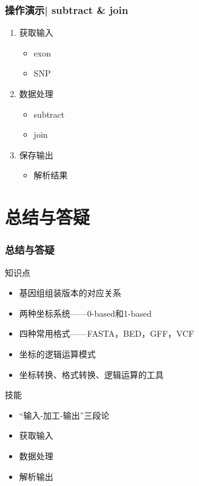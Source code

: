 \begin{frame}
	\frametitle{操作演示| subtract \& join}
	\begin{enumerate}[<+-|alert@+>]
		\item 获取输入
			\begin{itemize}
				\item exon
				\item SNP
			\end{itemize}
		\item 数据处理
			\begin{itemize}
				\item subtract
				\item join
			\end{itemize}
		\item 保存输出
			\begin{itemize}
				\item 解析结果
			\end{itemize}
	\end{enumerate}
\end{frame}

\section{总结与答疑}
\begin{frame}
	\frametitle{总结与答疑}
	\begin{block}{知识点}
		\begin{itemize}
			\item 基因组组装版本的对应关系
			\item 两种坐标系统——0-based和1-based
			\item 四种常用格式——FASTA，BED，GFF，VCF
			\item 坐标的逻辑运算模式
			\item 坐标转换、格式转换、逻辑运算的工具
		\end{itemize}
	\end{block}
	\begin{block}{技能}
		\begin{itemize}
			\item “输入-加工-输出”三段论
			\item 获取输入
			\item 数据处理
			\item 解析输出
		\end{itemize}
	\end{block}
\end{frame}

